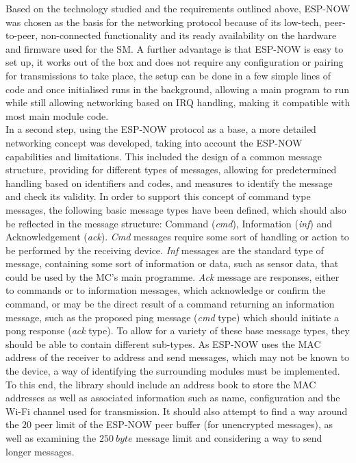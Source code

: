 Based on the technology studied and the requirements outlined above, ESP-NOW was chosen as the basis for the networking protocol because of its low-tech, peer-to-peer, non-connected functionality and its ready availability on the hardware and firmware used for the SM. A further advantage is that ESP-NOW is easy to set up, it works out of the box and does not require any configuration or pairing for transmissions to take place, the setup can be done in a few simple lines of code and once initialised runs in the background, allowing a main program to run while still allowing networking based on IRQ handling, making it compatible with most main module code.\\
In a second step, using the ESP-NOW protocol as a base, a more detailed networking concept was developed, taking into account the ESP-NOW capabilities and limitations. This included the design of a common message structure, providing for different types of messages, allowing for predetermined handling based on identifiers and codes, and measures to identify the message and check its validity. In order to support this concept of command type messages, the following basic message types have been defined, which should also be reflected in the message structure: Command (\textit{cmd}), Information (\textit{inf}) and Acknowledgement (\textit{ack}).
\textit{Cmd} messages require some sort of handling or action to be performed by the receiving device. 
\textit{Inf} messages are the standard type of message, containing some sort of information or data, such as sensor data, that could be used by the MC's main programme. \textit{Ack} message are responses, either to commands or to information messages, which acknowledge or confirm the command, or may be the direct result of a command returning an information message, such as the proposed ping message (\textit{cmd} type) which should initiate a pong response (\textit{ack} type). To allow for a variety of these base message types, they should be able to contain different sub-types.
As ESP-NOW uses the MAC address of the receiver to address and send messages, which may not be known to the device, a way of identifying the surrounding modules must be implemented. To this end, the library should include an address book to store the MAC addresses as well as associated information such as name, configuration and the Wi-Fi channel used for transmission. 
It should also attempt to find a way around the $20$ peer limit of the ESP-NOW peer buffer (for unencrypted messages), as well as examining the $250\ byte$ message limit and considering a way to send longer messages.\\
